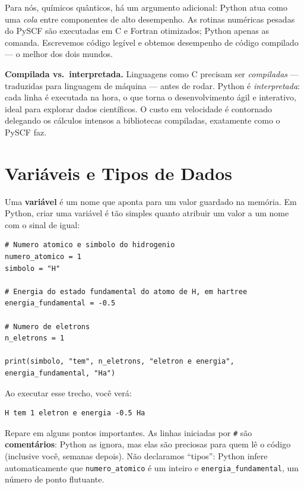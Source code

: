 \documentclass[11pt,a4paper,openany]{book}
\newcommand{\code}[1]{\texttt{#1}}
\newcommand{\pyscf}{\textsf{PySCF}}
\newcommand{\python}{\textsf{Python}}
\begin{document}
Para nós, químicos quânticos, há um argumento adicional: \python{} atua como uma
\emph{cola} entre componentes de alto desempenho. As rotinas numéricas pesadas
do \pyscf{} são executadas em C e Fortran otimizados; \python{} apenas as comanda.
Escrevemos código legível e obtemos desempenho de código compilado --- o melhor
dos dois mundos.

\begin{caixanota}
\textbf{Compilada vs.\ interpretada.} Linguagens como C precisam ser
\emph{compiladas} --- traduzidas para linguagem de máquina --- antes de rodar.
\python{} é \emph{interpretada}: cada linha é executada na hora, o que torna o
desenvolvimento ágil e interativo, ideal para explorar dados científicos. O
custo em velocidade é contornado delegando os cálculos intensos a bibliotecas
compiladas, exatamente como o \pyscf{} faz.
\end{caixanota}

\section{Variáveis e Tipos de Dados}
\label{sec:variaveis}

Uma \textbf{variável} é um nome que aponta para um valor guardado na memória. Em
\python{}, criar uma variável é tão simples quanto atribuir um valor a um nome com
o sinal de igual:

\begin{lstlisting}[style=python,caption={Primeiras variáveis: dados de um átomo de hidrogênio.},label={lst:varsH}]
# Numero atomico e simbolo do hidrogenio
numero_atomico = 1
simbolo = "H"

# Energia do estado fundamental do atomo de H, em hartree
energia_fundamental = -0.5

# Numero de eletrons
n_eletrons = 1

print(simbolo, "tem", n_eletrons, "eletron e energia", energia_fundamental, "Ha")
\end{lstlisting}

\noindent
Ao executar esse trecho, você verá:

\begin{lstlisting}[style=console]
H tem 1 eletron e energia -0.5 Ha
\end{lstlisting}

\noindent
Repare em alguns pontos importantes. As linhas iniciadas por \code{\#} são
\textbf{comentários}: \python{} as ignora, mas elas são preciosas para quem lê o
código (inclusive você, semanas depois). Não declaramos ``tipos'': \python{}
infere automaticamente que \code{numero\_atomico} é um inteiro e
\code{energia\_fundamental}, um número de ponto flutuante.
\end{document}
